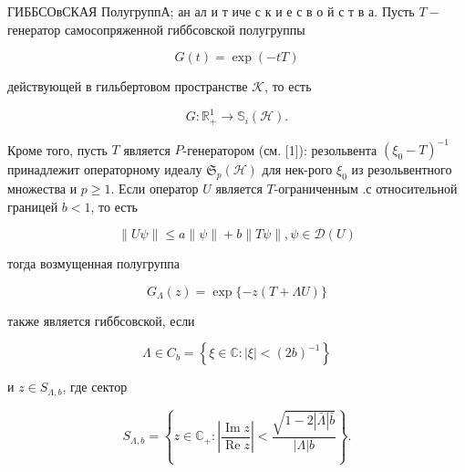\documentclass[10pt]{article}
\begin{document}
ГИББСОвСКАЯ ПолугруппА; ан ал и т иче с к и е с в о й с т в а. Пусть $T-$ генератор самосопряженной гиббсовской полугруппы



\[

G(t)=\exp (-t T)

\]



действующей в гильбертовом пространстве $\mathscr{K}$, то есть



\[

G: \mathbb{R}_{+}^{1} \rightarrow \mathbb{S}_{i}(\mathscr{H}) .

\]



Кроме того, пусть $T$ является $P$-генератором (см. [1]): резольвента $\left(\xi_{0}-T\right)^{-1}$ принадлежит операторному идеалу $\mathfrak{S}_{p}(\mathscr{H})$ для нек-рого $\xi_{0}$ из резольвентного множества и $p \geqslant 1$. Если оператор $U$ является $T$-ограниченным .с относительной границей $b<1$, то есть



\[

\|U \psi\| \leqslant a\|\psi\|+b\|T \psi\|, \psi \in \mathscr{D}(U)

\]



тогда возмущенная полугруппа



\[

G_{\Lambda}(z)=\exp \{-z(T+\Lambda U)\}

\]



также является гиббсовской, если



\[

\Lambda \in C_{b}=\left\{\xi \in \mathbb{C}:|\xi|<(2 b)^{-1}\right\}

\]



и $z \in S_{\Lambda, b}$, где сектор



\[

S_{\Lambda, b}=\left\{z \in \mathbb{C}_{+}:\left|\frac{\operatorname{Im} z}{\operatorname{Re} z}\right|<\frac{\sqrt{1-2|\bar{\Lambda}| \bar{b}}}{|\Lambda| b}\right\} .

\]
\end{document}
